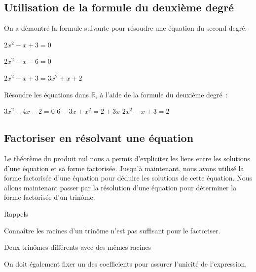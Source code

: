 \documentclass[a4paper,12pt]{article}
\begin{document}
\subsection{Utilisation de la formule du deuxième degré}
On a démontré la formule suivante pour résoudre une équation du second degré.

	\vspace{12cm}

\begin{exemple}
	$2x^2-x+3=0$
	\tcblower
	\vspace{10cm}
\end{exemple}
\begin{exemple}
	$2x^2-x-6=0$
	\tcblower
	\vspace{10cm}
\end{exemple}
\begin{exemple}
	$2x^2-x+3=3x^2+x+2$
	\tcblower
	\vspace{10cm}
\end{exemple}

Résoudre les équations dans $\mathbb{R}$, à l'aide de la formule du deuxième degré~:
\begin{tasks}
\task $3 x^2-4 x-2=0$
\task $6-3 x+x^2=2+3x$
\task $2 x^2-x+3=2$
\end{tasks}
\newpage
\subsection{Factoriser en résolvant une équation}
Le théorème du produit nul nous a permis d'expliciter les liens entre les solutions d'une équation et sa forme factorisée.
Jusqu'à maintenant, nous avons utilisé la forme factorisée d'une équation pour déduire les solutions de cette équation.
Nous allons maintenant passer par la résolution d'une équation pour déterminer la forme factorisée d'un trinôme. 
\begin{exemple}
	Rappels
	\tcblower
	\vspace{7cm}

\end{exemple}
Connaître les racines d'un trinôme n'est pas suffisant pour le factoriser.
\begin{exemple}
	Deux trinômes différents avec des mêmes racines
	\tcblower
	\vspace{13cm}

\end{exemple}
\newpage
On doit également fixer un des coefficients pour assurer l'unicité de l'expression.
\end{document}
